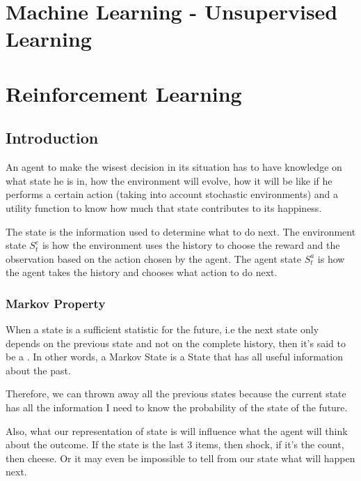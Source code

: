 \section{Machine Learning - Unsupervised Learning}


\section{Reinforcement Learning}

\subsection{Introduction}

An agent to make the wisest decision in its situation has to have knowledge on what state he is in, how the environment will evolve, how it will be like if he performs a certain action (taking into account stochastic environments) and a utility function to  know how much that state contributes to its happiness.



The state is the information used to determine what to do next. 
The environment state $S_t^e$ is how the environment uses the history to choose the reward and the observation based on the action chosen by the agent.
The agent state $S_t^a$ is how the agent takes the history and chooses what action to do next.

\subsubsection{Markov Property}

When a state is a sufficient statistic for the future, i.e the next state only depends on the previous state and not on the complete history, then it's said to be a . In other words, a Markov State is a State that has all useful information about the past.


Therefore, we can thrown away all the previous states because the current state has all the information I need to know the probability of the state of the future.

Also, what our representation of state is will influence what the agent will think about the outcome. If the state is the last 3 items, then shock, if it's the count, then cheese. Or it may even be impossible to tell from our state what will happen next.

